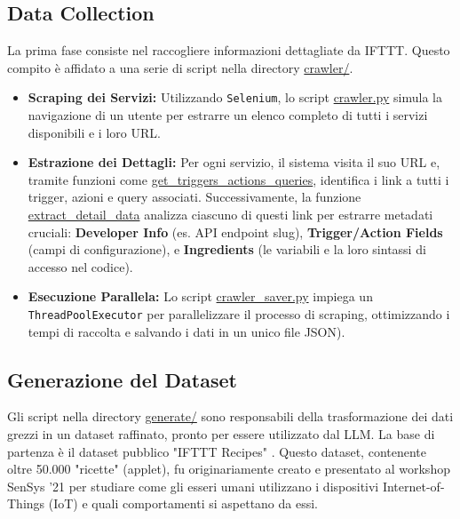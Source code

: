 \documentclass[sigconf,natbib=false]{acmart}
\begin{document}
\subsection{Data Collection}
La prima fase consiste nel raccogliere informazioni dettagliate da IFTTT. Questo compito è affidato a una serie di script nella directory \url{crawler/}.
\begin{itemize}
    \item \textbf{Scraping dei Servizi:} Utilizzando \texttt{Selenium}, lo script \url{crawler.py} simula la navigazione di un utente per estrarre un elenco completo di tutti i servizi disponibili e i loro URL.
    \item \textbf{Estrazione dei Dettagli:} Per ogni servizio, il sistema visita il suo URL e, tramite funzioni come \url{get_triggers_actions_queries}, identifica i link a tutti i trigger, azioni e query associati. Successivamente, la funzione \url{extract_detail_data} analizza ciascuno di questi link per estrarre metadati cruciali: \textbf{Developer Info} (es. API endpoint slug), \textbf{Trigger/Action Fields} (campi di configurazione), e \textbf{Ingredients} (le variabili e la loro sintassi di accesso nel codice).
    \item \textbf{Esecuzione Parallela:} Lo script \url{crawler_saver.py} impiega un \texttt{ThreadPoolExecutor} per parallelizzare il processo di scraping, ottimizzando i tempi di raccolta e salvando i dati in un unico file JSON).
\end{itemize}

\subsection{Generazione del Dataset}
Gli script nella directory \url{generate/} sono responsabili della trasformazione dei dati grezzi in un dataset raffinato, pronto per essere utilizzato dal LLM. La base di partenza è il dataset pubblico "IFTTT Recipes" \cite{yu2021dataset}. Questo dataset, contenente oltre 50.000 "ricette" (applet), fu originariamente creato e presentato al workshop SenSys '21 per studiare come gli esseri umani utilizzano i dispositivi Internet-of-Things (IoT) e quali comportamenti si aspettano da essi.
\end{document}
